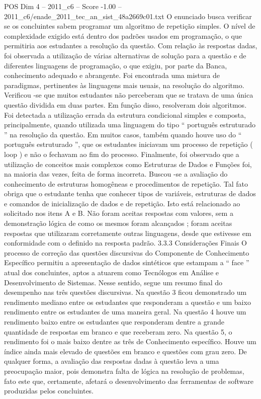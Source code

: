 \begin{textsample}{POS Dim 4 – 2011\_c6 – Score -1.00 – 2011\_c6/enade\_2011\_tec\_an\_sist\_48a2669c01.txt}
O enunciado busca verificar se os concluintes sabem programar um algoritmo de repetição simples.
O nível de complexidade exigido está dentro dos padrões usados em programação, o que permitiria aos estudantes a resolução da questão.
Com relação às respostas dadas, foi observada a utilização de várias alternativas de solução para a questão e de diferentes linguagens de programação, o que exigiu, por parte da Banca, conhecimento adequado e abrangente.
Foi encontrada uma mistura de paradigmas, pertinentes às linguagens mais usuais, na resolução do algoritmo.
Verificou -se que muitos estudantes não perceberam que se tratava de uma única questão dividida em duas partes.
Em função disso, resolveram dois algoritmos.
Foi detectada a utilização errada da estrutura condicional simples e composta, principalmente, quando utilizada uma linguagem do tipo “ português estruturado ” na resolução da questão.
Em muitos casos, também quando houve uso do “ português estruturado ”, que os estudantes iniciavam um processo de repetição ( loop ) e não o fechavam ao fim do processo.
Finalmente, foi observado que a utilização de conceitos mais complexos como Estruturas de Dados e Funções foi, na maioria das vezes, feita de forma incorreta.
Buscou -se a avaliação do conhecimento de estruturas homogêneas e procedimentos de repetição.
Tal fato obriga que o estudante tenha que conhecer tipos de variáveis, estruturas de dados e comandos de inicialização de dados e de repetição.
Isto está relacionado ao solicitado nos itens A e B.
Não foram aceitas respostas com valores, sem a demonstração lógica de como os mesmos foram alcançados ; foram aceitas respostas que utilizaram corretamente outras linguagens, desde que estivesse em conformidade com o definido na resposta padrão. 3.3.3 Considerações Finais O processo de correção das questões discursivas do Componente de Conhecimento Específico permitiu a apresentação de dados sintéticos que estampam a “ face ” atual dos concluintes, aptos a atuarem como Tecnólogos em Análise e Desenvolvimento de Sistemas.
Nesse sentido, segue um resumo final do desempenho nas três questões discursivas.
Na questão 3 ficou demonstrado um rendimento mediano entre os estudantes que responderam a questão e um baixo rendimento entre os estudantes de uma maneira geral.
Na questão 4 houve um rendimento baixo entre os estudantes que responderam dentre a grande quantidade de respostas em branco e que receberam zero.
Na questão 5, o rendimento foi o mais baixo dentre as três de Conhecimento específico.
Houve um índice ainda mais elevado de questões em branco e questões com grau zero.
De qualquer forma, a avaliação das respostas dadas à questão leva a uma preocupação maior, pois demonstra falta de lógica na resolução de problemas, fato este que, certamente, afetará o desenvolvimento das ferramentas de software produzidas pelos concluintes.

\end{textsample}
